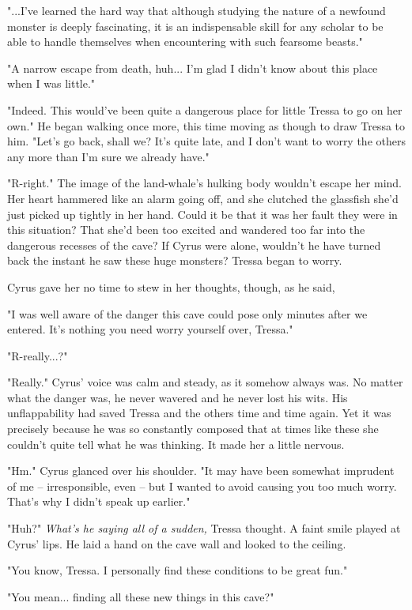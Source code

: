 "...I've learned the hard way that although studying the nature of a newfound monster is deeply fascinating, it is an indispensable skill for any scholar to be able to handle themselves when encountering with such fearsome beasts."

"A narrow escape from death, huh... I'm glad I didn't know about this place when I was little."

"Indeed. This would've been quite a dangerous place for little Tressa to go on her own." He began walking once more, this time moving as though to draw Tressa to him. "Let's go back, shall we? It's quite late, and I don't want to worry the others any more than I'm sure we already have."

"R-right." The image of the land-whale's hulking body wouldn't escape her mind. Her heart hammered like an alarm going off, and she clutched the glassfish she'd just picked up tightly in her hand. Could it be that it was her fault they were in this situation? That she'd been too excited and wandered too far into the dangerous recesses of the cave? If Cyrus were alone, wouldn't he have turned back the instant he saw these huge monsters? Tressa began to worry.

Cyrus gave her no time to stew in her thoughts, though, as he said,

"I was well aware of the danger this cave could pose only minutes after we entered. It's nothing you need worry yourself over, Tressa."

"R-really...?"

"Really." Cyrus' voice was calm and steady, as it somehow always was. No matter what the danger was, he never wavered and he never lost his wits. His unflappability had saved Tressa and the others time and time again. Yet it was precisely because he was so constantly composed that at times like these she couldn't quite tell what he was thinking. It made her a little nervous.

"Hm." Cyrus glanced over his shoulder. "It may have been somewhat imprudent of me -- irresponsible, even -- but I wanted to avoid causing you too much worry. That's why I didn't speak up earlier."

"Huh?" \emph{What's he saying all of a sudden,} Tressa thought. A faint smile played at Cyrus' lips. He laid a hand on the cave wall and looked to the ceiling.

"You know, Tressa. I personally find these conditions to be great fun."

"You mean... finding all these new things in this cave?"

